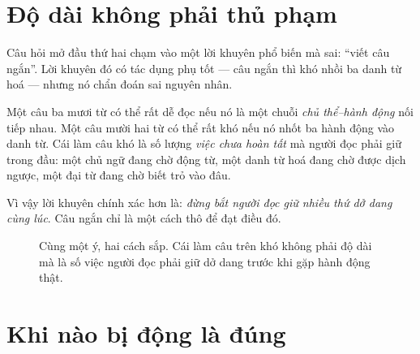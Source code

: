 \documentclass[../../english.tex]{subfiles}
\begin{document}
\section{Độ dài không phải thủ phạm}

Câu hỏi mở đầu thứ hai chạm vào một lời khuyên phổ biến mà sai: ``viết câu ngắn''. Lời khuyên đó có tác dụng phụ tốt --- câu ngắn thì khó nhồi ba danh từ hoá --- nhưng nó chẩn đoán sai nguyên nhân.

Một câu ba mươi từ có thể rất dễ đọc nếu nó là một chuỗi \emph{chủ thể--hành động} nối tiếp nhau. Một câu mười hai từ có thể rất khó nếu nó nhốt ba hành động vào danh từ. Cái làm câu khó là số lượng \emph{việc chưa hoàn tất} mà người đọc phải giữ trong đầu: một chủ ngữ đang chờ động từ, một danh từ hoá đang chờ được dịch ngược, một đại từ đang chờ biết trỏ vào đâu.

Vì vậy lời khuyên chính xác hơn là: \emph{đừng bắt người đọc giữ nhiều thứ dở dang cùng lúc}. Câu ngắn chỉ là một cách thô để đạt điều đó.

\begin{figure}[H]\centering
{}
\caption{Cùng một ý, hai cách sắp. Cái làm câu trên khó không phải độ dài mà là số việc người đọc phải giữ dở dang trước khi gặp hành động thật.}
\label{fig:cau-ro-tai}
\end{figure}

\section{Khi nào bị động là đúng}
\end{document}

